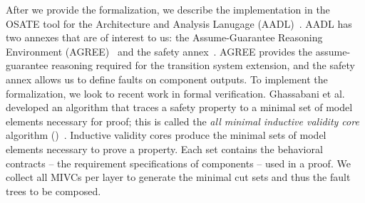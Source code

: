 After we provide the formalization, we describe the implementation in the OSATE tool for the Architecture and Analysis Lanugage (AADL)~\cite{FeilerModelBasedEngineering2012}. AADL has two annexes that are of interest to us: the Assume-Guarantee Reasoning Environment (AGREE)~\cite{NFM2012:CoGaMiWhLaLu} and the safety annex~\cite{stewart2020safety}. AGREE provides the assume-guarantee reasoning required for the transition system extension, and the safety annex allows us to define faults on component outputs. To implement the formalization, we look to recent work in formal verification. Ghassabani et al. developed an algorithm that traces a safety property to a minimal set of model elements necessary for proof; this is called the \textit{all minimal inductive validity core} algorithm (\aivcalg)~\cite{GhassabaniGW16,Ghassabani2017EfficientGO}. Inductive validity cores produce the minimal sets of model elements necessary to prove a property. Each set contains the behavioral contracts -- the requirement specifications of components -- used in a proof. We collect all MIVCs per layer to generate the minimal cut sets and thus the fault trees to be composed.




